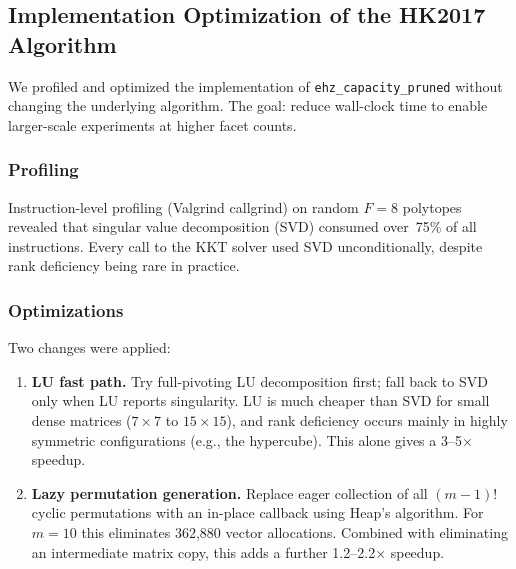 %

\subsection{Implementation Optimization of the HK2017 Algorithm}
\label{sec:hk2017-optimization}

We profiled and optimized the implementation of \texttt{ehz\_capacity\_pruned}
without changing the underlying algorithm. The goal: reduce wall-clock time
to enable larger-scale experiments at higher facet counts.

\subsubsection*{Profiling}

Instruction-level profiling (Valgrind callgrind) on random $F = 8$ polytopes
revealed that singular value decomposition (SVD) consumed over~75\% of all
instructions. Every call to the KKT solver used SVD unconditionally, despite
rank deficiency being rare in practice.

\subsubsection*{Optimizations}

Two changes were applied:

\begin{enumerate}
  \item \textbf{LU fast path.} Try full-pivoting LU decomposition first;
    fall back to SVD only when LU reports singularity. LU is much cheaper
    than SVD for small dense matrices ($7 \times 7$ to $15 \times 15$),
    and rank deficiency occurs mainly in highly symmetric configurations
    (e.g., the hypercube). This alone gives a 3--5$\times$ speedup.

  \item \textbf{Lazy permutation generation.} Replace eager collection of
    all $(m{-}1)!$ cyclic permutations with an in-place callback using
    Heap's algorithm. For $m = 10$ this eliminates 362{,}880 vector
    allocations. Combined with eliminating an intermediate matrix copy,
    this adds a further 1.2--2.2$\times$ speedup.
\end{enumerate}

